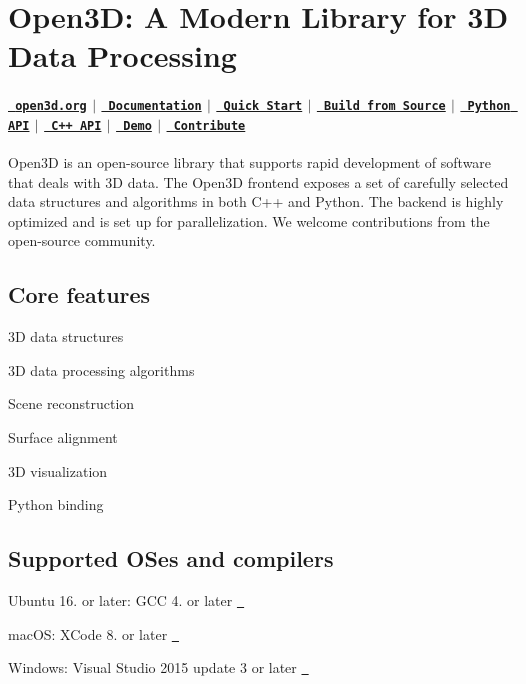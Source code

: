  

\section*{Open3D\+: A Modern Library for 3D Data Processing}

\paragraph*{\href{http://www.open3d.org}{\texttt{ open3d.\+org}} $\vert$ \href{http://www.open3d.org/docs}{\texttt{ Documentation}} $\vert$ \href{http://open3d.org/docs/getting_started.html}{\texttt{ Quick Start}} $\vert$ \href{http://www.open3d.org/docs/compilation.html}{\texttt{ Build from Source}} $\vert$ \href{http://www.open3d.org/docs/index.html\#python-api-index}{\texttt{ Python A\+PI}} $\vert$ \href{http://open3d.org/cppapi/index.html}{\texttt{ C++ A\+PI}} $\vert$ \href{https://www.youtube.com/watch?v=I3UjXlA4IsU}{\texttt{ Demo}} $\vert$ \href{http://www.open3d.org/docs/contribute.html}{\texttt{ Contribute}} }

Open3D is an open-\/source library that supports rapid development of software that deals with 3D data. The Open3D frontend exposes a set of carefully selected data structures and algorithms in both C++ and Python. The backend is highly optimized and is set up for parallelization. We welcome contributions from the open-\/source community.

\subsection*{Core features}


\begin{DoxyItemize}
\item 3D data structures
\item 3D data processing algorithms
\item Scene reconstruction
\item Surface alignment
\item 3D visualization
\item Python binding
\end{DoxyItemize}

\subsection*{Supported O\+Ses and compilers}


\begin{DoxyItemize}
\item Ubuntu 16. or later\+: G\+CC 4. or later \href{https://travis-ci.org/intel-isl/Open3D}{\texttt{ }}
\item mac\+OS\+: X\+Code 8. or later \href{https://travis-ci.org/intel-isl/Open3D}{\texttt{ }}
\item Windows\+: Visual Studio 2015 update 3 or later \href{https://ci.appveyor.com/project/yxlao/open3d/branch/master}{\texttt{ }}
\end{DoxyItemize}

